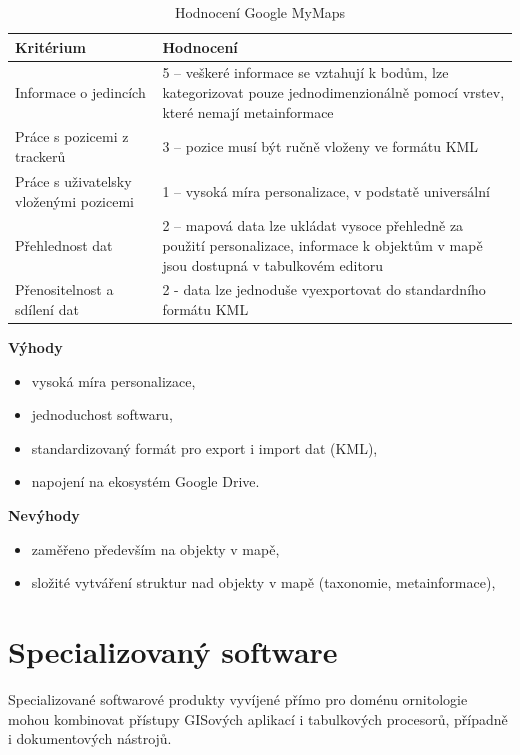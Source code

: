 \begin{table}[h]
	\begin{tabularx}{\textwidth}{ | X | X | }
		\hline
		Kritérium                              & Hodnocení \\
		\hline			
		Informace o jedincích                  & 5 -- veškeré informace se vztahují k bodům, lze kategorizovat pouze jednodimenzionálně pomocí vrstev, které nemají metainformace          \\
		\hline
		Práce s pozicemi z trackerů            & 3 -- pozice musí být ručně vloženy ve formátu KML          \\
		\hline
		Práce s uživatelsky vloženými pozicemi & 1 -- vysoká míra personalizace, v podstatě universální          \\
		\hline
		Přehlednost dat                        & 2 -- mapová data lze ukládat vysoce přehledně za použití personalizace, informace k objektům v mapě jsou dostupná v tabulkovém editoru          \\
		\hline
		Přenositelnost a sdílení dat           & 2 - data lze jednoduše vyexportovat do standardního formátu KML          \\
		\hline	
	\end{tabularx}
	\caption{Hodnocení Google MyMaps}
\end{table}

\textbf{Výhody}

\begin{itemize}
	\item vysoká míra personalizace,
	\item jednoduchost softwaru,
	\item standardizovaný formát pro export i import dat (KML),
	\item napojení na ekosystém Google Drive.
\end{itemize}

\textbf{Nevýhody}

\begin{itemize}
	\item zaměřeno především na objekty v mapě,
	\item složité vytváření struktur nad objekty v mapě (taxonomie, metainformace),
\end{itemize}

\section{Specializovaný software}

Specializované softwarové produkty vyvíjené přímo pro doménu ornitologie mohou kombinovat přístupy GISových aplikací i tabulkových procesorů, případně i dokumentových nástrojů.

